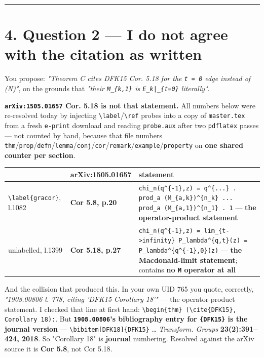 \documentclass[11pt,a4paper]{article}
\begin{document}
\medskip\hrule\medskip

\section*{4. Question 2 --- I do not agree with the citation as written}

You propose: \emph{"Theorem C cites DFK15 Cor. 5.18 for the \mbox{\texttt{t = 0}} edge instead of (N)"}, on the grounds that \emph{"their \mbox{\texttt{M\_\{k,1\}}} is \mbox{\texttt{E\_k|\_\{t=0\}}} literally"}.

\textbf{\mbox{\texttt{arXiv:1505.01657}} Cor. 5.18 is not that statement.} All numbers below were re-resolved today by injecting \mbox{\texttt{\textbackslash{}label}}/\mbox{\texttt{\textbackslash{}ref}} probes into a copy of \mbox{\texttt{master.tex}} from a fresh \mbox{\texttt{e-print}} download and reading \mbox{\texttt{probe.aux}} after two \mbox{\texttt{pdflatex}} passes --- not counted by hand, because that file numbers \mbox{\texttt{thm}}/\mbox{\texttt{prop}}/\mbox{\texttt{defn}}/\mbox{\texttt{lemma}}/\mbox{\texttt{conj}}/\mbox{\texttt{cor}}/\mbox{\texttt{remark}}/\mbox{\texttt{example}}/\mbox{\texttt{property}} on \textbf{one shared counter per section}.

\begin{center}\footnotesize
\begin{tabular}{@{}p{}p{}p{}@{}}
\hline
\textbf{} & \textbf{arXiv:1505.01657} & \textbf{statement}\\ \hline
\mbox{\texttt{\textbackslash{}label\{gracor\}}}, l.1082 & \textbf{Cor 5.8, p.20} & \mbox{\texttt{chi\_n(q\textasciicircum{}\{-1\},z) = q\textasciicircum{}\{...\} . prod\_a (M\_\{a,k\})\textasciicircum{}\{n\_k\} ... prod\_a (M\_\{a,1\})\textasciicircum{}\{n\_1\} . 1}} --- \textbf{the operator-product statement}\\
unlabelled, l.1399 & \textbf{Cor 5.18, p.27} & \mbox{\texttt{chi\_n(q\textasciicircum{}\{-1\},z) = lim\_\{t->infinity\} P\_lambda\textasciicircum{}\{q,t\}(z) = P\_lambda\textasciicircum{}\{q\textasciicircum{}\{-1\},0\}(z)}} --- \textbf{the Macdonald-limit statement}; contains \textbf{no \mbox{\texttt{M}} operator at all}\\
\hline\end{tabular}\end{center}

And the collision that produced this. In your own UID 765 you quote, correctly, \emph{"1908.00806 l. 778, citing 'DFK15 Corollary 18'"} --- the operator-product statement. I checked that line at first hand: \mbox{\texttt{\textbackslash{}begin\{thm\} (\textbackslash{}cite\{DFK15\}, Corollary 18):}}. But \textbf{\mbox{\texttt{1908.00806}}'s bibliography entry for \mbox{\texttt{\{DFK15\}}} is the journal version} --- \mbox{\texttt{\textbackslash{}bibitem[DFK18]\{DFK15\}}} \dots{} \emph{Transform. Groups} \textbf{23(2):391--424, 2018}. So "Corollary 18" is \textbf{journal} numbering. Resolved against the arXiv source it is \textbf{Cor 5.8}, not Cor 5.18.
\end{document}
